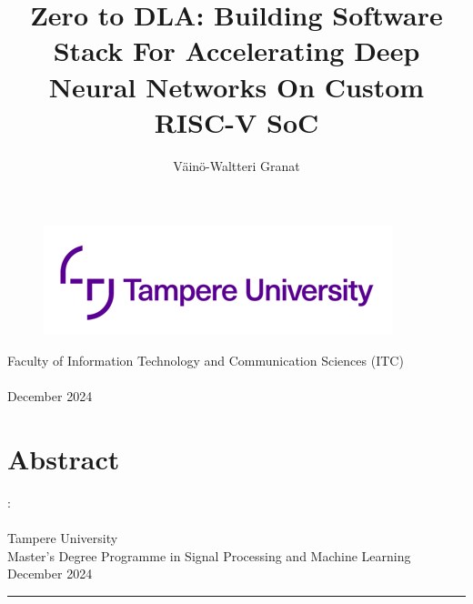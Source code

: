 \documentclass[12pt,a4paper,english
]{tunithesis}
\author{Väinö-Waltteri Granat}
\title{Zero to DLA: Building Software Stack For Accelerating Deep Neural Networks On Custom RISC-V SoC} %
\begin{document}
\makeatletter

\thispagestyle{empty}
\vspace*{-.5cm}\noindent

\begin{figure}
    \vspace{-1.3cm}
    \advance\leftskip-2.5cm
    \noindent\includegraphics{img/tunilogo.png}
\end{figure}
 
\vspace{2.5cm}
\begin{flushright}
\noindent\textsf{\LARGE{\@author}}

\noindent\vspace{0.5cm}

\noindent\Huge{\textsf{\textbf{\textcolor{tunipurple}{\@title}}}}
\end{flushright}
\vspace{10.7cm} %

\begin{flushright}  
    \begin{spacing}{1.0}
      \textsf{Faculty of Information Technology and Communication Sciences (ITC)\\
      \@thesistype\\
      December 2024}
    \end{spacing}
\end{flushright}

\if@twoside
\clearpage
\fi




\chapter*{Abstract}

\begin{spacing}{1.0}
\noindent \@author: \@title\\
\@thesistype\\
Tampere University\\
Master’s Degree Programme in Signal Processing and Machine Learning\\
December 2024
\end{spacing}
\noindent\rule{12cm}{0.4pt}
\end{document}
